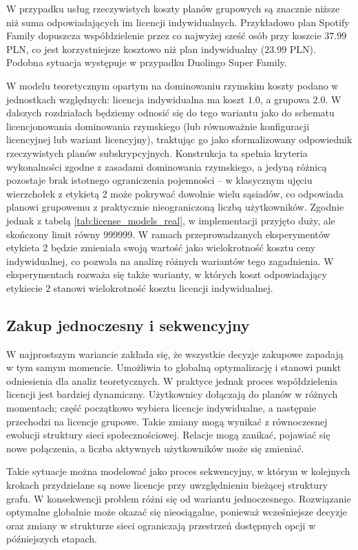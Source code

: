 W przypadku usług rzeczywistych koszty planów grupowych są znacznie niższe niż suma odpowiadających im licencji indywidualnych. Przykładowo plan Spotify Family dopuszcza współdzielenie przez co najwyżej sześć osób przy koszcie $37.99$ PLN, co jest korzystniejsze kosztowo niż plan indywidualny ($23.99$ PLN). Podobna sytuacja występuje w przypadku Duolingo Super Family.

W modelu teoretycznym opartym na dominowaniu rzymskim koszty podano w jednostkach względnych: licencja indywidualna ma koszt $1.0$, a grupowa $2.0$. W dalszych rozdziałach będziemy odnosić się do tego wariantu jako do schematu licencjonowania dominowania rzymskiego (lub równoważnie konfiguracji licencyjnej lub wariant licencyjny), traktując go jako sformalizowany odpowiednik rzeczywistych planów subskrypcyjnych. Konstrukcja ta spełnia kryteria wykonalności zgodne z zasadami dominowania rzymskiego, a jedyną różnicą pozostaje brak istotnego ograniczenia pojemności -- w klasycznym ujęciu wierzchołek z etykietą 2 może pokrywać dowolnie wielu sąsiadów, co odpowiada planowi grupowemu z praktycznie nieograniczoną liczbą użytkowników. Zgodnie jednak z tabelą \ref{tab:license_models_real}, w implementacji przyjęto duży, ale skończony limit równy 999999. W ramach przeprowadzanych eksperymentów etykieta 2 będzie zmieniała swoją wartość jako wielokrotność kosztu ceny indywidualnej, co pozwala na analizę różnych wariantów tego zagadnienia. W eksperymentach rozważa się także warianty, w których koszt odpowiadający etykiecie \(2\) stanowi wielokrotność kosztu licencji indywidualnej.


\subsection{Zakup jednoczesny i sekwencyjny}

W najprostszym wariancie zakłada się, że wszystkie decyzje zakupowe zapadają w tym samym momencie. Umożliwia to globalną optymalizację i stanowi punkt odniesienia dla analiz teoretycznych. W praktyce jednak proces współdzielenia licencji jest bardziej dynamiczny. Użytkownicy dołączają do planów w różnych momentach; część początkowo wybiera licencje indywidualne, a następnie przechodzi na licencje grupowe. Takie zmiany mogą wynikać z równoczesnej ewolucji struktury sieci społecznościowej. Relacje mogą zanikać, pojawiać się nowe połączenia, a liczba aktywnych użytkowników może się zmieniać.

Takie sytuacje można modelować jako proces sekwencyjny, w którym w kolejnych krokach przydzielane są nowe licencje przy uwzględnieniu bieżącej struktury grafu. W konsekwencji problem różni się od wariantu jednoczesnego. Rozwiązanie optymalne globalnie może okazać się nieosiągalne, ponieważ wcześniejsze decyzje oraz zmiany w strukturze sieci ograniczają przestrzeń dostępnych opcji w późniejszych etapach.

